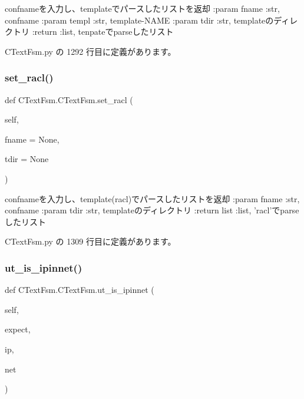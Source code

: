 \begin{DoxyVerb}confnameを入力し、templateでパースしたリストを返却
:param fname :str, confname
:param templ :str, template-NAME
:param tdir  :str, templateのディレクトリ
:return :list, tenpateでparseしたリスト
\end{DoxyVerb}
 

 C\+Text\+Fsm.\+py の 1292 行目に定義があります。

\mbox{\label{classCTextFsm_1_1CTextFsm_af6338783bf6b3879a1e522d534602a96}} 
\subsubsection{\texorpdfstring{set\_racl()}{set\_racl()}}
{\footnotesize\ttfamily def C\+Text\+Fsm.\+C\+Text\+Fsm.\+set\+\_\+racl (\begin{DoxyParamCaption}\item[{}]{self,  }\item[{}]{fname = {\ttfamily None},  }\item[{}]{tdir = {\ttfamily None} }\end{DoxyParamCaption})}

\begin{DoxyVerb}confnameを入力し、template(racl)でパースしたリストを返却
:param  fname :str, confname
:param  tdir  :str, templateのディレクトリ
:return list :list, 'racl'でparseしたリスト
\end{DoxyVerb}
 

 C\+Text\+Fsm.\+py の 1309 行目に定義があります。

\mbox{\label{classCTextFsm_1_1CTextFsm_ad48b822b0ee1c57c37e671a1b380d0bb}} 
\subsubsection{\texorpdfstring{ut\_is\_ipinnet()}{ut\_is\_ipinnet()}}
{\footnotesize\ttfamily def C\+Text\+Fsm.\+C\+Text\+Fsm.\+ut\+\_\+is\+\_\+ipinnet (\begin{DoxyParamCaption}\item[{}]{self,  }\item[{}]{expect,  }\item[{}]{ip,  }\item[{}]{net }\end{DoxyParamCaption})}

